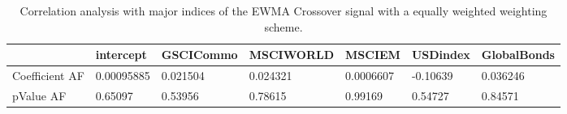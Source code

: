\begin{table}[H]
\centering
\begin{tabular}{lllllll}
& intercept & GSCICommo & MSCIWORLD & MSCIEM & USDindex & GlobalBonds \\ 
\hline 
Coefficient AF & 0.00095885 & 0.021504 & 0.024321 & 0.0006607 & -0.10639 & 0.036246 \\ 
pValue AF & 0.65097 & 0.53956 & 0.78615 & 0.99169 & 0.54727 & 0.84571 \\ 
\hline
\end{tabular}
\caption{Correlation analysis with major indices of the EWMA Crossover signal with a equally weighted weighting scheme.}
\label{MBBSEWNR_AFACTOR}
\end{table}